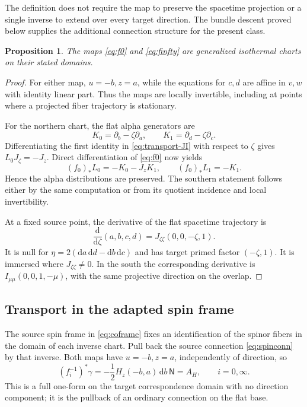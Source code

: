 \documentclass[11pt]{article}
\numberwithin{equation}{section}
\newtheorem{proposition}[theorem]{Proposition}
\theoremstyle{definition}
\theoremstyle{remark}
\newcommand{\dd}{\mathrm d}
\newcommand{\NN}{\mathsf N}
\begin{document}
The definition does not require the map to preserve the spacetime projection or a single inverse to extend over every target direction. The bundle descent proved below supplies the additional connection structure for the present class.

\begin{proposition}\label{prop:charts}
The maps \eqref{eq:f0} and \eqref{eq:finfty} are generalized isothermal charts on their stated domains.
\end{proposition}
\begin{proof}
For either map, $u=-b,z=a$, while the equations for $c,d$ are affine in $v,w$ with identity linear part. Thus the maps are locally invertible, including at points where a projected fiber trajectory is stationary.

For the northern chart, the flat alpha generators are
\begin{equation}\label{eq:K}
K_0=\partial_b-\zeta\partial_a,
\qquad K_1=\partial_d-\zeta\partial_c.
\end{equation}
Differentiating the first identity in \eqref{eq:transport-JI} with respect to $\zeta$ gives $L_0J_\zeta=-J_z$. Direct differentiation of \eqref{eq:f0} now yields
\begin{equation}\label{eq:pushforward}
(f_0)_*L_0=-K_0-J_zK_1,
\qquad (f_0)_*L_1=-K_1.
\end{equation}
Hence the alpha distributions are preserved. The southern statement follows either by the same computation or from its quotient incidence and local invertibility.

At a fixed source point, the derivative of the flat spacetime trajectory is
\begin{equation}\label{eq:nulltrajectory}
\frac{\dd}{\dd\zeta}(a,b,c,d)
=J_{\zeta\zeta}(0,0,-\zeta,1).
\end{equation}
It is null for $\eta=2(\dd a\,\dd d-\dd b\,\dd c)$ and has target primed factor $(-\zeta,1)$. It is immersed where $J_{\zeta\zeta}\ne0$. In the south the corresponding derivative is $I_{\mu\mu}(0,0,1,-\mu)$, with the same projective direction on the overlap.
\end{proof}

\subsection{Transport in the adapted spin frame}

The source spin frame in \eqref{eq:coframe} fixes an identification of the spinor fibers in the domain of each inverse chart. Pull back the source connection \eqref{eq:spinconn} by that inverse. Both maps have $u=-b,z=a$, independently of direction, so
\begin{equation}\label{eq:pullbackA}
(f_i^{-1})^*\gamma=-\frac12H_z(-b,a)\,\dd b\,\NN=A_H,
\qquad i=0,\infty.
\end{equation}
This is a full one-form on the target correspondence domain with no direction component; it is the pullback of an ordinary connection on the flat base.
\end{document}
